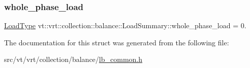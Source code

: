 \subsubsection{\texorpdfstring{whole\+\_\+phase\+\_\+load}{whole\_phase\_load}}
{\footnotesize\ttfamily \hyperlink{namespacevt_a8fb51741340b87d7aaee0bef60e9896b}{Load\+Type} vt\+::vrt\+::collection\+::balance\+::\+Load\+Summary\+::whole\+\_\+phase\+\_\+load = 0.}



The documentation for this struct was generated from the following file\+:\begin{DoxyCompactItemize}
\item 
src/vt/vrt/collection/balance/\hyperlink{lb__common_8h}{lb\+\_\+common.\+h}\end{DoxyCompactItemize}

